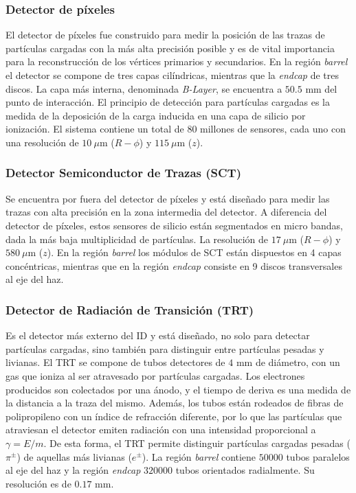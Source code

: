 \subsubsection{Detector de píxeles}

El detector de píxeles fue construido para medir la posición de las trazas de partículas cargadas con la más alta precisión posible y es de vital importancia para la reconstrucción de los vértices primarios y secundarios. En la región \textit{barrel} el detector se compone de tres capas cilíndricas, mientras que la \textit{endcap} de tres discos. La capa más interna, denominada \textit{B-Layer}, se encuentra a $50.5$ mm del punto de interacción. El principio de detección para partículas cargadas es la medida de la deposición de la carga inducida en una capa de silicio por ionización. El sistema contiene un total de $80$ millones de sensores, cada uno con una resolución de $10\:\mu$m ($R-\phi$) y $115\:\mu$m ($z$).

\subsubsection{Detector Semiconductor de Trazas (SCT)}

Se encuentra por fuera del detector de píxeles y está diseñado para medir las trazas con alta precisión en la zona intermedia del detector. A diferencia del detector de píxeles, estos sensores de silicio están segmentados en micro bandas, dada la más baja multiplicidad de partículas. La resolución de $17\:\mu$m ($R-\phi$) y $580\:\mu$m ($z$). En la región \textit{barrel} los módulos de SCT están dispuestos en 4 capas concéntricas, mientras que en la región \textit{endcap} consiste en 9 discos transversales al eje del haz.

\subsubsection{Detector de Radiación de Transición (TRT)}

Es el detector más externo del ID y está diseñado, no solo para detectar partículas cargadas, sino también para distinguir entre partículas pesadas y livianas. El TRT se compone de tubos detectores de $4$ mm de diámetro, con un gas que ioniza al ser atravesado por partículas cargadas. Los electrones producidos son colectados por una ánodo, y el tiempo de deriva es una medida de la distancia a la traza del mismo.  Además, los tubos están rodeados de fibras de polipropileno con un índice de refracción diferente, por lo que las partículas que atraviesan el detector emiten radiación con una intensidad proporcional a $\gamma=E/m$. De esta forma, el TRT permite distinguir partículas cargadas pesadas ($\pi^{\pm}$) de aquellas más livianas ($e^{\pm}$). La región \textit{barrel} contiene $50000$ tubos paralelos al eje del haz y la región \textit{endcap} $320000$ tubos orientados radialmente. Su resolución es de $0.17$ mm.


